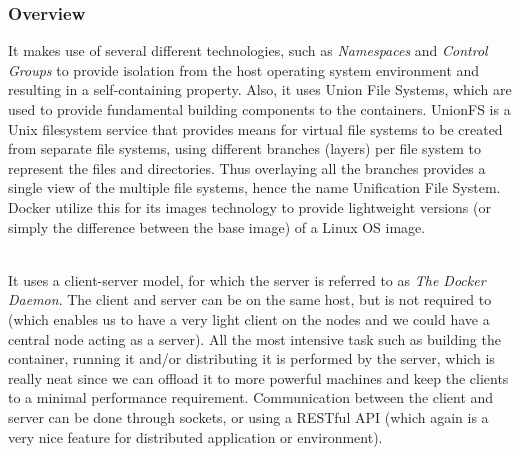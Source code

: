 \documentclass[11pt]{amsart}
\begin{document}
\begin{enumarate}
          \subsubsection{Overview}
          It makes use of several different technologies, such as \emph{Namespaces} and
          \emph{Control Groups} to provide isolation from the host operating system
          environment and resulting in a self-containing property. Also, it uses Union
          File Systems, which are used to provide fundamental building components to the
          containers. UnionFS is a Unix filesystem service that provides means for virtual
          file systems to be created from separate file systems, using different branches
          (layers) per file system to represent the files and directories. Thus overlaying
          all the branches provides a single view of the multiple file systems, hence the
          name Unification File System. Docker utilize this for its images technology to
          provide lightweight versions (or simply the difference between the base image)
          of a Linux OS image. 
         
          \\ It uses a client-server model, for which the server is referred to as
          \emph{The Docker Daemon}. The client and server can be on the same host, but is
          not required to (which enables us to have a very light client on the nodes and
          we could have a central node acting as a server). All the most intensive task
          such as building the container, running it and/or distributing it is performed
          by the server, which is really neat since we can offload it to more powerful
          machines and keep the clients to a minimal performance
          requirement. Communication between the client and server can be done through
          sockets, or using a RESTful API (which again is a very nice feature for
          distributed application or environment).


\end{enumarate}
\end{document}
